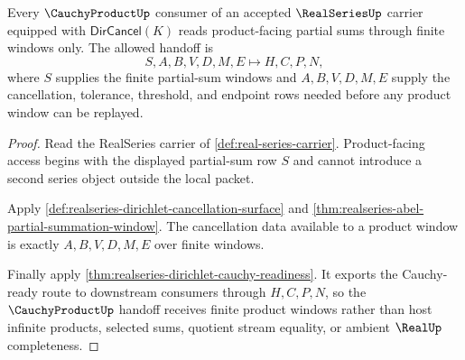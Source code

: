 \begin{theorem}
\label{thm:realseries-cauchy-product-finite-window}
Every $\CauchyProductUp$ consumer of an accepted $\RealSeriesUp$ carrier equipped with $\mathsf{DirCancel}(K)$ reads product-facing partial sums through finite windows only. The allowed handoff is
$$
S,A,B,V,D,M,E \longmapsto H,C,P,N ,
$$
where $S$ supplies the finite partial-sum windows and $A,B,V,D,M,E$ supply the cancellation, tolerance, threshold, and endpoint rows needed before any product window can be replayed.
\end{theorem}
\begin{proof}
Read the RealSeries carrier of \autoref{def:real-series-carrier}. Product-facing access begins with the displayed partial-sum row $S$ and cannot introduce a second series object outside the local packet.

Apply \autoref{def:realseries-dirichlet-cancellation-surface} and \autoref{thm:realseries-abel-partial-summation-window}. The cancellation data available to a product window is exactly $A,B,V,D,M,E$ over finite windows.

Finally apply \autoref{thm:realseries-dirichlet-cauchy-readiness}. It exports the Cauchy-ready route to downstream consumers through $H,C,P,N$, so the $\CauchyProductUp$ handoff receives finite product windows rather than host infinite products, selected sums, quotient stream equality, or ambient $\RealUp$ completeness.
\end{proof}



